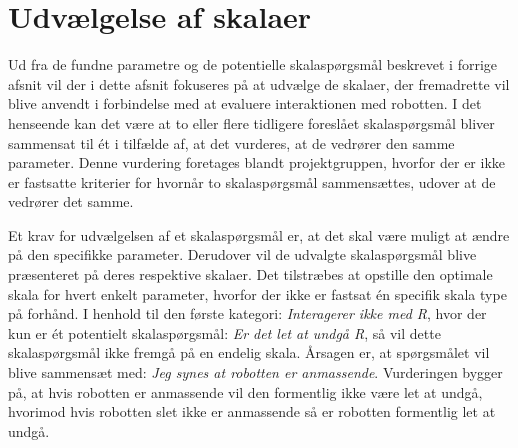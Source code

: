 \section{Udvælgelse af skalaer}
\label{ParametreDatabehandlingSkalaer}
%
Ud fra de fundne parametre og de potentielle skalaspørgsmål beskrevet i forrige afsnit vil der i dette afsnit fokuseres på at udvælge de skalaer, der fremadrette vil blive anvendt i forbindelse med at evaluere interaktionen med robotten. I det henseende kan det være at to eller flere tidligere foreslået skalaspørgsmål bliver sammensat til ét i tilfælde af, at det vurderes, at de vedrører den samme parameter. Denne vurdering foretages blandt projektgruppen, hvorfor der er ikke er fastsatte kriterier for hvornår to skalaspørgsmål sammensættes, udover at de vedrører det samme.

Et krav for udvælgelsen af et skalaspørgsmål er, at det skal være muligt at ændre på den specifikke parameter. Derudover vil de udvalgte skalaspørgsmål blive præsenteret på deres respektive skalaer. Det tilstræbes at opstille den optimale skala for hvert enkelt parameter, hvorfor der ikke er fastsat én specifik skala type på forhånd.\blankline
%
I henhold til den første kategori: \textit{Interagerer ikke med R}, hvor der kun er ét potentielt skalaspørgsmål: \textit{Er det let at undgå R}, så vil dette skalaspørgsmål ikke fremgå på en endelig skala. Årsagen er, at spørgsmålet vil blive sammensæt med: \textit{Jeg synes at robotten er anmassende}. Vurderingen bygger på, at hvis robotten er anmassende vil den formentlig ikke være let at undgå, hvorimod hvis robotten slet ikke er anmassende så er robotten formentlig let at undgå. 

